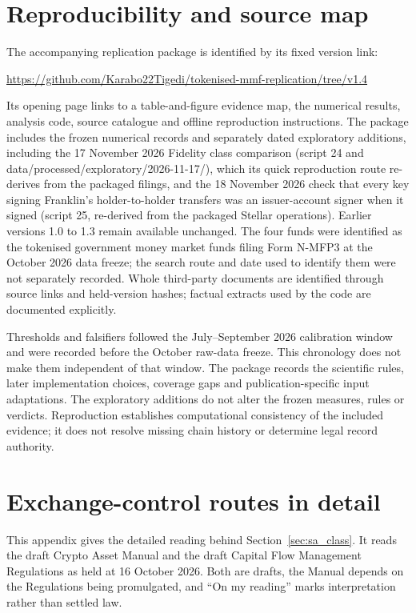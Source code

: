 \documentclass[12pt,a4paper]{article}
\begin{document}
\section{Reproducibility and source map}\label{app:reproduction}
The accompanying replication package is identified by its fixed version link:
\begin{center}
\url{https://github.com/Karabo22Tigedi/tokenised-mmf-replication/tree/v1.4}
\end{center}
Its opening page links to a table-and-figure evidence map, the numerical results, analysis code, source catalogue and offline reproduction instructions. The package includes the frozen numerical records and separately dated exploratory additions, including the 17 November 2026 Fidelity class comparison (script 24 and data/\allowbreak processed/\allowbreak exploratory/\allowbreak\mbox{2026-11-17/}), which its quick reproduction route re-derives from the packaged filings, and the 18 November 2026 check that every key signing Franklin's holder-to-holder transfers was an issuer-account signer when it signed (script 25, re-derived from the packaged Stellar operations). Earlier versions 1.0 to 1.3 remain available unchanged. The four funds were identified as the tokenised government money market funds filing Form N-MFP3 at the October 2026 data freeze; the search route and date used to identify them were not separately recorded. Whole third-party documents are identified through source links and held-version hashes; factual extracts used by the code are documented explicitly.

Thresholds and falsifiers followed the July--September 2026 calibration window and were recorded before the October raw-data freeze. This chronology does not make them independent of that window. The package records the scientific rules, later implementation choices, coverage gaps and publication-specific input adaptations. The exploratory additions do not alter the frozen measures, rules or verdicts. Reproduction establishes computational consistency of the included evidence; it does not resolve missing chain history or determine legal record authority.

\section{Exchange-control routes in detail}\label{app:exchange}
This appendix gives the detailed reading behind Section~\ref{sec:sa_class}. It reads the draft Crypto Asset Manual and the draft Capital Flow Management Regulations as held at 16 October 2026. Both are drafts, the Manual depends on the Regulations being promulgated, and ``On my reading'' marks interpretation rather than settled law.
\end{document}
